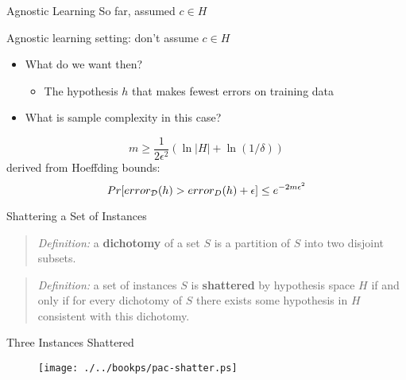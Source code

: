 \documentclass[%
pdf,
colorBG,
slideColor,
tcrico,
]{prosper}
\begin{document}


\begin{slide}{Agnostic Learning }
\tiny
So far, assumed $c \in H$

\vspace*{.1in}

Agnostic learning setting: don't assume $c \in H$

\begin{itemize}
\item What do we want then?
\begin{itemize} \item The hypothesis $h$ that makes fewest errors on training data \end{itemize}
\item What is sample complexity in this case?
\end{itemize}

\[ m \geq \frac{1}{2 \epsilon^{2}}(\ln|H| + \ln(1/\delta)) \]
derived from Hoeffding bounds:
\[ Pr[error_{\cal D}(h) > error_D(h) + \epsilon] \leq e^{-2m\epsilon^{2}} \]
\end{slide}



\begin{slide}{Shattering a Set of Instances }

\begin{quote}
{\em Definition:} a {\bf dichotomy} of a set $S$ is a partition of $S$ into
two disjoint subsets.
\end{quote}

\begin{quote}
{\em Definition:} a set of instances $S$ is {\bf shattered} by hypothesis
space $H$ if and only if for every dichotomy of $S$ there exists some
hypothesis in $H$ consistent with this dichotomy.
\end{quote}
\end{slide}


\begin{slide}{Three Instances Shattered }
	\begin{figure}
		\texttt{[image: ./../bookps/pac-shatter.ps]}
	\end{figure}
\end{slide}
\end{document}

